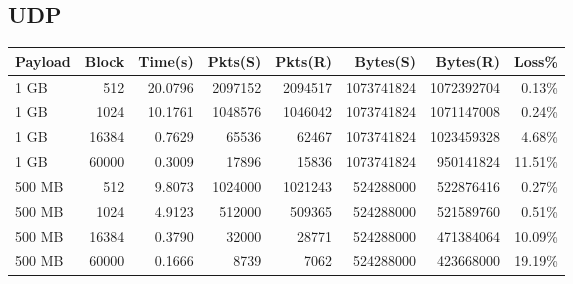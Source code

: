 \documentclass{article}
\begin{document}
\subsection{ UDP}
\begin{small}
    \begin{longtable}{l r r r r r r r}
        \toprule
        \textbf{Payload} & \textbf{Block} & \textbf{Time(s)} & \textbf{Pkts(S)} & \textbf{Pkts(R)} & \textbf{Bytes(S)} & \textbf{Bytes(R)} & \textbf{Loss\%} \\
        \midrule
        1 GB             & 512            & 20.0796          & 2097152          & 2094517          & 1073741824        & 1072392704        & 0.13\%          \\
        1 GB             & 1024           & 10.1761          & 1048576          & 1046042          & 1073741824        & 1071147008        & 0.24\%          \\
        1 GB             & 16384          & 0.7629           & 65536            & 62467            & 1073741824        & 1023459328        & 4.68\%          \\
        1 GB             & 60000          & 0.3009           & 17896            & 15836            & 1073741824        & 950141824         & 11.51\%         \\
        500 MB           & 512            & 9.8073           & 1024000          & 1021243          & 524288000         & 522876416         & 0.27\%          \\
        500 MB           & 1024           & 4.9123           & 512000           & 509365           & 524288000         & 521589760         & 0.51\%          \\
        500 MB           & 16384          & 0.3790           & 32000            & 28771            & 524288000         & 471384064         & 10.09\%         \\
        500 MB           & 60000          & 0.1666           & 8739             & 7062             & 524288000         & 423668000         & 19.19\%         \\
        \bottomrule
    \end{longtable}
\end{small}
\end{document}
